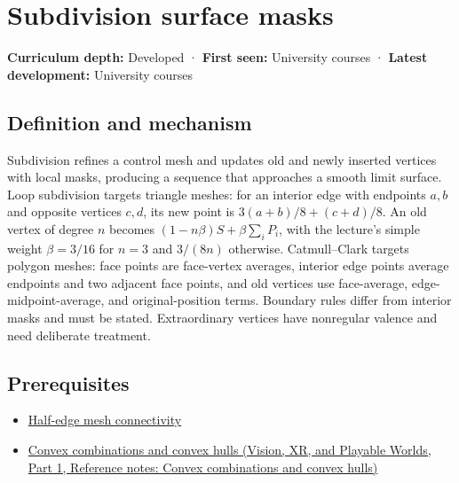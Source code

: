 \hypertarget{appendix-0234ab7f86b1}{}\label{referencestart:appendix-0234ab7f86b1}
\section{Subdivision surface masks}\label{appendix-0234ab7f86b1-subdivision-surface-masks}

\hypertarget{appendix-0234ab7f86b1-subdivision-surface-masks}{}

\textbf{Curriculum depth:} Developed · \textbf{First seen:} University courses · \textbf{Latest development:} University courses

\begin{allmightroledefinition}

\subsection{Definition and mechanism}\label{appendix-0234ab7f86b1-definition-and-mechanism}

\hypertarget{appendix-0234ab7f86b1-definition-and-mechanism}{}

Subdivision refines a control mesh and updates old and newly inserted vertices with local masks, producing a sequence that approaches a smooth limit surface. Loop subdivision targets triangle meshes: for an interior edge with endpoints \(a,b\) and opposite vertices \(c,d\), its new point is \(3(a+b)/8+(c+d)/8\). An old vertex of degree \(n\) becomes \((1-n\beta)S+\beta\sum_iP_i\), with the lecture's simple weight \(\beta=3/16\) for \(n=3\) and \(3/(8n)\) otherwise. Catmull--Clark targets polygon meshes: face points are face-vertex averages, interior edge points average endpoints and two adjacent face points, and old vertices use face-average, edge-midpoint-average, and original-position terms. Boundary rules differ from interior masks and must be stated. Extraordinary vertices have nonregular valence and need deliberate treatment.

\end{allmightroledefinition}

\subsection{Prerequisites}\label{appendix-0234ab7f86b1-prerequisites}

\hypertarget{appendix-0234ab7f86b1-prerequisites}{}

\begin{itemize}
\tightlist
\item
  \hyperref[appendix-1aea26b2307f]{Half-edge mesh connectivity}
\item
  \href{../07-Vision-XR-and-Playable-Worlds-P01/main.pdf\#nameddest=appendix-0026ec42c9d5}{Convex combinations and convex hulls (Vision, XR, and Playable Worlds, Part 1, Reference notes: Convex combinations and convex hulls)}
\end{itemize}


